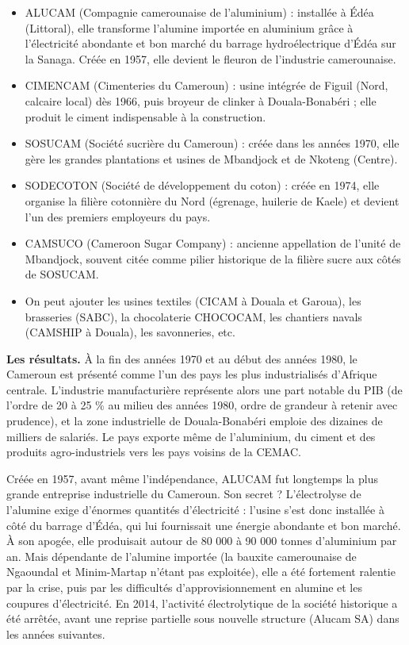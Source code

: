 \documentclass[11pt]{article}
\newcommand{\cle}[1]{{\popxbold\color{popdark}#1}}
\begin{document}
\begin{itemize}
\item \cle{ALUCAM} (Compagnie camerounaise de l'aluminium) : installée à \cle{Édéa} (Littoral), elle transforme l'alumine importée en aluminium grâce à l'électricité abondante et bon marché du barrage hydroélectrique d'Édéa sur la Sanaga. Créée en 1957, elle devient le fleuron de l'industrie camerounaise.
\item \cle{CIMENCAM} (Cimenteries du Cameroun) : usine intégrée de \cle{Figuil} (Nord, calcaire local) dès 1966, puis broyeur de clinker à \cle{Douala-Bonabéri} ; elle produit le ciment indispensable à la construction.
\item \cle{SOSUCAM} (Société sucrière du Cameroun) : créée dans les années 1970, elle gère les grandes plantations et usines de \cle{Mbandjock} et de \cle{Nkoteng} (Centre).
\item \cle{SODECOTON} (Société de développement du coton) : créée en 1974, elle organise la filière cotonnière du Nord (égrenage, huilerie de Kaele) et devient l'un des premiers employeurs du pays.
\item \cle{CAMSUCO} (Cameroon Sugar Company) : ancienne appellation de l'unité de Mbandjock, souvent citée comme pilier historique de la filière sucre aux côtés de SOSUCAM.
\item On peut ajouter les usines textiles (\cle{CICAM} à Douala et Garoua), les brasseries (\cle{SABC}), la chocolaterie \cle{CHOCOCAM}, les chantiers navals (\cle{CAMSHIP} à Douala), les savonneries, etc.
\end{itemize}

\textbf{Les résultats.} À la fin des années 1970 et au début des années 1980, le Cameroun est présenté comme l'un des pays les plus industrialisés d'Afrique centrale. L'industrie manufacturière représente alors une part notable du PIB (de l'ordre de 20 à 25 \% au milieu des années 1980, ordre de grandeur à retenir avec prudence), et la zone industrielle de Douala-Bonabéri emploie des dizaines de milliers de salariés. Le pays exporte même de l'aluminium, du ciment et des produits agro-industriels vers les pays voisins de la CEMAC.

\begin{savaistu}
Créée en 1957, avant même l'indépendance, \cle{ALUCAM} fut longtemps la plus grande entreprise industrielle du Cameroun. Son secret ? L'électrolyse de l'alumine exige d'énormes quantités d'électricité : l'usine s'est donc installée à côté du barrage d'Édéa, qui lui fournissait une énergie abondante et bon marché. À son apogée, elle produisait autour de 80 000 à 90 000 tonnes d'aluminium par an. Mais dépendante de l'alumine importée (la bauxite camerounaise de Ngaoundal et Minim-Martap n'étant pas exploitée), elle a été fortement ralentie par la crise, puis par les difficultés d'approvisionnement en alumine et les coupures d'électricité. En 2014, l'activité électrolytique de la société historique a été arrêtée, avant une reprise partielle sous nouvelle structure (Alucam SA) dans les années suivantes.
\end{savaistu}
\end{document}
